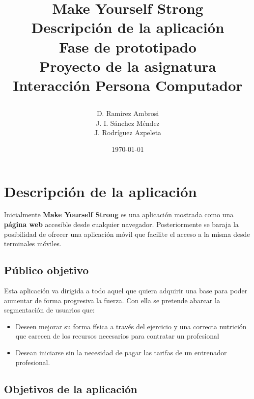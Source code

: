\documentclass[a4paper]{article}
\date{}
\author{D. Ramirez Ambrosi \\ J. I. Sánchez Méndez \\ J. Rodríguez Azpeleta}
\title{\begin{center}
\textbf{\Huge{Make Yourself Strong}} \\ Descripción de la aplicación \\ Fase de prototipado \\Proyecto de la asignatura Interacción Persona Computador
\end{center}}
\date{\today}
\renewcommand\listfigurename{\centering LISTA DE FIGURAS}
\begin{document}
\maketitle

\thispagestyle{empty}%
\newpage
\tableofcontents%
\thispagestyle{empty}
\newpage





\setcounter{page}{1}%

\section{Descripción de la aplicación}

Inicialmente \textbf{Make Yourself Strong} es una aplicación mostrada como una \textbf{página web} accesible desde cualquier navegador. Posteriormente se baraja la posibilidad de ofrecer una aplicación móvil que facilite el acceso a la misma desde terminales móviles.

\subsection{Público objetivo}
Esta aplicación va dirigida a todo aquel que quiera adquirir una base para poder aumentar de forma progresiva la fuerza. Con ella se pretende abarcar la segmentación de usuarios que:

\begin{itemize}
	\item	Deseen mejorar su forma física a través del ejercicio y una correcta nutrición que carecen de los recursos necesarios para contratar un profesional
	\item	Desean iniciarse sin la necesidad de pagar las tarifas de un entrenador profesional.
\end{itemize}


\subsection{Objetivos de la aplicación}
\end{document}
